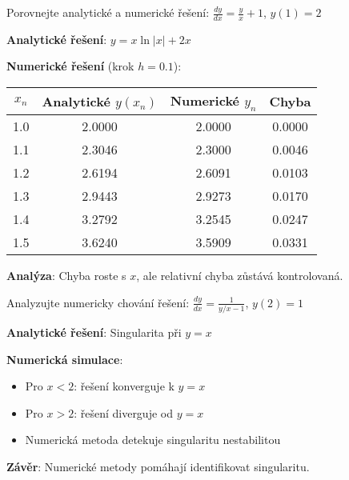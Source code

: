 \vspace{0.6\baselineskip}

\begin{example}
Porovnejte analytické a numerické řešení: $\frac{dy}{dx} = \frac{y}{x} + 1$, $y(1) = 2$
\vspace{0.3\baselineskip}

\textbf{Analytické řešení}: $y = x\ln|x| + 2x$

\textbf{Numerické řešení} (krok $h = 0.1$):
\begin{center}
\begin{tabular}{c|c|c|c}
$x_n$ & Analytické $y(x_n)$ & Numerické $y_n$ & Chyba \\
\hline
1.0 & 2.0000 & 2.0000 & 0.0000 \\
1.1 & 2.3046 & 2.3000 & 0.0046 \\
1.2 & 2.6194 & 2.6091 & 0.0103 \\
1.3 & 2.9443 & 2.9273 & 0.0170 \\
1.4 & 3.2792 & 3.2545 & 0.0247 \\
1.5 & 3.6240 & 3.5909 & 0.0331 \\
\end{tabular}
\end{center}

\textbf{Analýza}: Chyba roste s $x$, ale relativní chyba zůstává kontrolovaná.
\end{example}

\vspace{0.6\baselineskip}

\begin{example}
Analyzujte numericky chování řešení: $\frac{dy}{dx} = \frac{1}{y/x - 1}$, $y(2) = 1$
\vspace{0.3\baselineskip}

\textbf{Analytické řešení}: Singularita při $y = x$

\textbf{Numerická simulace}:
\begin{itemize}
\item Pro $x < 2$: řešení konverguje k $y = x$
\item Pro $x > 2$: řešení diverguje od $y = x$
\item Numerická metoda detekuje singularitu nestabilitou
\end{itemize}

\textbf{Závěr}: Numerické metody pomáhají identifikovat singularitu.
\end{example}

\vspace{0.8\baselineskip}

